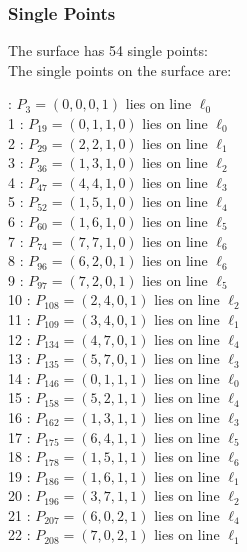 \documentclass{article}
\begin{document}
{\subsubsection*{Single Points}
The surface has 54 single points:\\
The single points on the surface are:\\
\begin{multicols}{2}
 : $P_{3}=( 0, 0, 0, 1 )$ lies on line $\ell_{0}$\\
1 : $P_{19}=( 0, 1, 1, 0 )$ lies on line $\ell_{0}$\\
2 : $P_{29}=( 2, 2, 1, 0 )$ lies on line $\ell_{1}$\\
3 : $P_{36}=( 1, 3, 1, 0 )$ lies on line $\ell_{2}$\\
4 : $P_{47}=( 4, 4, 1, 0 )$ lies on line $\ell_{3}$\\
5 : $P_{52}=( 1, 5, 1, 0 )$ lies on line $\ell_{4}$\\
6 : $P_{60}=( 1, 6, 1, 0 )$ lies on line $\ell_{5}$\\
7 : $P_{74}=( 7, 7, 1, 0 )$ lies on line $\ell_{6}$\\
8 : $P_{96}=( 6, 2, 0, 1 )$ lies on line $\ell_{6}$\\
9 : $P_{97}=( 7, 2, 0, 1 )$ lies on line $\ell_{5}$\\
10 : $P_{108}=( 2, 4, 0, 1 )$ lies on line $\ell_{2}$\\
11 : $P_{109}=( 3, 4, 0, 1 )$ lies on line $\ell_{1}$\\
12 : $P_{134}=( 4, 7, 0, 1 )$ lies on line $\ell_{4}$\\
13 : $P_{135}=( 5, 7, 0, 1 )$ lies on line $\ell_{3}$\\
14 : $P_{146}=( 0, 1, 1, 1 )$ lies on line $\ell_{0}$\\
15 : $P_{158}=( 5, 2, 1, 1 )$ lies on line $\ell_{4}$\\
16 : $P_{162}=( 1, 3, 1, 1 )$ lies on line $\ell_{3}$\\
17 : $P_{175}=( 6, 4, 1, 1 )$ lies on line $\ell_{5}$\\
18 : $P_{178}=( 1, 5, 1, 1 )$ lies on line $\ell_{6}$\\
19 : $P_{186}=( 1, 6, 1, 1 )$ lies on line $\ell_{1}$\\
20 : $P_{196}=( 3, 7, 1, 1 )$ lies on line $\ell_{2}$\\
21 : $P_{207}=( 6, 0, 2, 1 )$ lies on line $\ell_{4}$\\
22 : $P_{208}=( 7, 0, 2, 1 )$ lies on line $\ell_{1}$\\

\end{multicols}}
\end{document}
